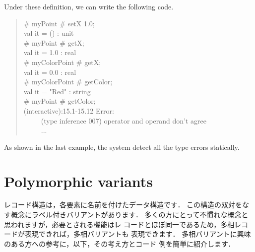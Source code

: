 \documentclass{jbook}
\newcommand{\txt}[2]{#2}
\newcommand{\myem}{\ \ \ \ \  }
\begin{document}
	Under these definition, we can write the following code.
\begin{tt}\begin{quote}
\# myPoint \# setX 1.0;\\
val it = () : unit\\
\# myPoint \# getX;\\
val it = 1.0 : real\\
\# myColorPoint \# getX;\\
val it = 0.0 : real\\
\# myColorPoint \# getColor;\\
val it = "Red" : string\\
\# myPoint \# getColor;\\
(interactive):15.1-15.12 Error:\\
\myem  (type inference 007) operator and operand don't agree\\
\myem ...
\end{quote}\end{tt}
	As shown in the last example, the system detect all the type
errors statically.
\fi%

\section{\txt{多相バリアントの表現}{Polymorphic variants}}
\label{sec:extensionVariant}

\ifx\jp%
	レコード構造は，各要素に名前を付けたデータ構造です．
	この構造の双対をなす概念にラベル付きバリアントがあります．
	多くの方にとって不慣れな概念と思われますが，必要とされる機能はレ
コードとほぼ同一であるため，多相レコードが表現できれば，多相バリアントも
表現できます．
	多相バリアントに興味のある方への参考に，以下，その考え方とコード
例を簡単に紹介します．
\end{document}
